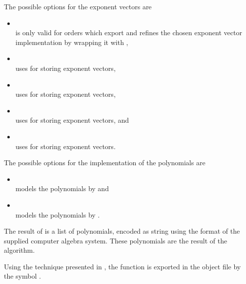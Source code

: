 The possible options for the exponent vectors are
\begin{itemize}
\item {} \\ is only valid for orders which export  and refines the chosen exponent vector implementation by wrapping it with ,
\item {} \\ uses  for storing exponent vectors,
\item {} \\ uses  for storing exponent vectors,
\item {} \\ uses  for storing exponent vectors, and
\item {} \\ uses  for storing exponent vectors.
\end{itemize}

The possible options for the implementation of the polynomials are
\begin{itemize}
\item {} \\ models the polynomials by  and
\item {} \\ models the polynomials by .
\end{itemize}

The result  of  is a list of polynomials, encoded as \C string using the format of the supplied computer algebra system. These polynomials are the result of the algorithm.


Using the technique presented in , the function  is exported in the object file by the symbol \exportedsymbol.

